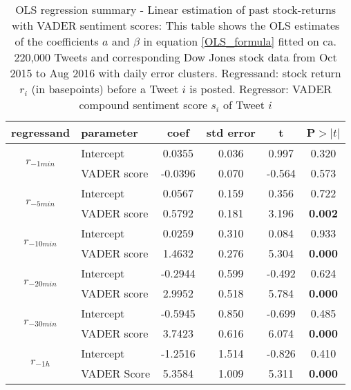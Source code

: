 \documentclass[a4paper,12pt]{article}%
\begin{document}
\begin{table}
\centering
\captionsetup{justification=centering}
\begin{tabularx}{0.76\textwidth}{c|l|cccc}
 regressand & parameter & coef & std error & t & P$>|t|$\\ \hline

\multirow{2}{*}{$r_{-1min}$} & Intercept &  0.0355  &        0.036     &     0.997  &         0.320        \\
& VADER score &      -0.0396  &        0.070     &    -0.564  &         0.573          \\ \hline

\multirow{2}{*}{$r_{-5min}$} & Intercept &      0.0567  &        0.159     &     0.356  &         0.722         \\
& VADER score &       0.5792  &        0.181     &     3.196  &         \textbf{0.002}            \\ \hline


\multirow{2}{*}{$r_{-10min}$} &   Intercept &    0.0259  &        0.310     &     0.084  &         0.933      \\
& VADER score &       1.4632  &        0.276     &     5.304  &         \textbf{0.000}    \\ \hline

\multirow{2}{*}{$r_{-20min}$} &   Intercept &   -0.2944  &        0.599     &    -0.492  &         0.624      \\
& VADER score &       2.9952  &        0.518     &     5.784  &         \textbf{0.000} \\ \hline

\multirow{2}{*}{$r_{-30min}$} &   Intercept &   -0.5945  &        0.850     &    -0.699  &         0.485    \\
& VADER score &       3.7423  &        0.616     &     6.074  &         \textbf{0.000} \\ \hline

\multirow{2}{*}{$r_{-1h}$} &   Intercept &      -1.2516  &        1.514     &    -0.826  &         0.410     \\
& VADER Score &       5.3584  &        1.009     &     5.311  &        \textbf{0.000}         \\ \hline
\end{tabularx}
\caption[Regression Summary Short-Term Stock Returns in the Past and Tweet Sentiment]{OLS regression summary - Linear estimation of past stock-returns with VADER sentiment scores: This table shows the OLS estimates of the coefficients $a$ and $\beta$ in equation \ref{OLS_formula} fitted on ca. 220,000 Tweets and corresponding Dow Jones stock data from Oct 2015 to Aug 2016 with daily error clusters. Regressand: stock return $r_i$ (in basepoints) before a Tweet $i$ is posted. Regressor: VADER compound sentiment score $s_i$ of Tweet $i$ \label{vader_short_term_backw}}
\end{table}
\end{document}
